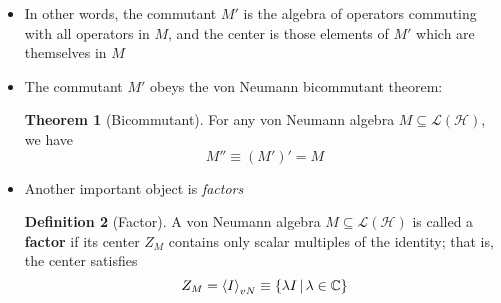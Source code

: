 \documentclass[12pt,a4paper]{article}
\numberwithin{equation}{section}
\newcommand{\gen}[1]{\braket{#1}_{vN}}
\theoremstyle{definition}
\newtheorem{definition}{Definition}[section]
\theoremstyle{theorem}
\newtheorem{theorem}{Theorem}[section]
\theoremstyle{example}
\begin{document}
\begin{itemize}
\begin{definition}[Center]
			\begin{equation}
				Z_{M}\equiv M\cap M'
			\end{equation}
		\end{definition}
		\item In other words, the commutant $M'$ is the algebra of operators commuting with all operators in $M$, and the center is those elements of $M'$ which are themselves in $M$
		\item The commutant $M'$ obeys the von Neumann bicommutant theorem:
		\begin{theorem}[Bicommutant]
			For any von Neumann algebra $M\subseteq\mathcal{L}(\mathcal{H})$, we have
			\begin{equation}
				M''\equiv(M')'=M
			\end{equation}
		\end{theorem}
		\item Another important object is \textit{factors}
		\begin{definition}[Factor]
			A von Neumann algebra $M\subseteq\mathcal{L}(\mathcal{H})$ is called a \textbf{factor} if its center $Z_{M}$ contains only scalar multiples of the identity; that is, the center satisfies
			\begin{equation}
				Z_{M}=\gen{I}\equiv\left\{\lambda I\,|\,\lambda\in\mathbb{C}\right\}
			\end{equation}
		\end{definition}
	\end{itemize}
\end{document}
